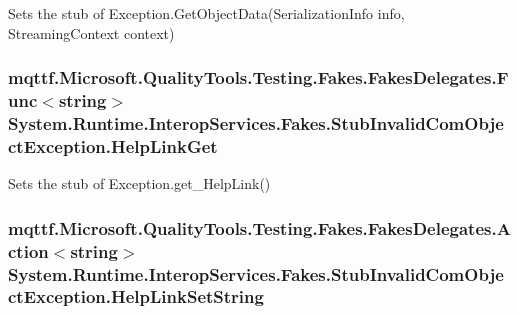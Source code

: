 Sets the stub of Exception.\-Get\-Object\-Data(\-Serialization\-Info info, Streaming\-Context context)

\hypertarget{class_system_1_1_runtime_1_1_interop_services_1_1_fakes_1_1_stub_invalid_com_object_exception_a3a1a5a9e8b53dac7a7eed860373a1323}{
\subsubsection[{Help\-Link\-Get}]{\setlength{\rightskip}{0pt plus 5cm}mqttf.\-Microsoft.\-Quality\-Tools.\-Testing.\-Fakes.\-Fakes\-Delegates.\-Func$<$string$>$ System.\-Runtime.\-Interop\-Services.\-Fakes.\-Stub\-Invalid\-Com\-Object\-Exception.\-Help\-Link\-Get}}\label{class_system_1_1_runtime_1_1_interop_services_1_1_fakes_1_1_stub_invalid_com_object_exception_a3a1a5a9e8b53dac7a7eed860373a1323}


Sets the stub of Exception.\-get\-\_\-\-Help\-Link()

\hypertarget{class_system_1_1_runtime_1_1_interop_services_1_1_fakes_1_1_stub_invalid_com_object_exception_a4999fd42ef4683267167989b9a55034b}{
\subsubsection[{Help\-Link\-Set\-String}]{\setlength{\rightskip}{0pt plus 5cm}mqttf.\-Microsoft.\-Quality\-Tools.\-Testing.\-Fakes.\-Fakes\-Delegates.\-Action$<$string$>$ System.\-Runtime.\-Interop\-Services.\-Fakes.\-Stub\-Invalid\-Com\-Object\-Exception.\-Help\-Link\-Set\-String}}\label{class_system_1_1_runtime_1_1_interop_services_1_1_fakes_1_1_stub_invalid_com_object_exception_a4999fd42ef4683267167989b9a55034b}


